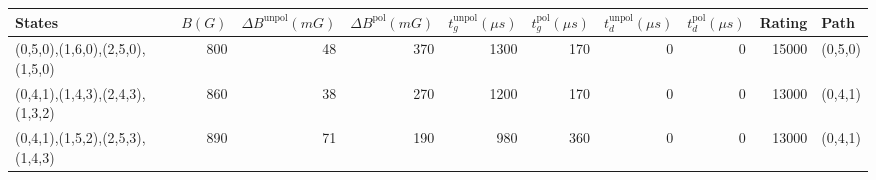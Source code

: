 \begin{tabular}{lrrrrrrrrl}
\hline
 {States}                        &   {$B(G)$} &   {$\Delta B^{\text{unpol}}(mG)$} &   {$\Delta B^{\text{pol}}(mG)$} &   {$t^{\text{unpol}}_{g}(\mu s)$} &   {$t^{\text{pol}}_{g}(\mu s)$} &   {$t^{\text{unpol}}_{d}(\mu s)$} &   {$t^{\text{pol}}_{d}(\mu s)$} &   {Rating} & {Path}   \\
\hline
 (0,5,0),(1,6,0),(2,5,0),(1,5,0) &        800 &                                48 &                             370 &                              1300 &                             170 &                                 0 &                               0 &      15000 & (0,5,0)  \\
 (0,4,1),(1,4,3),(2,4,3),(1,3,2) &        860 &                                38 &                             270 &                              1200 &                             170 &                                 0 &                               0 &      13000 & (0,4,1)  \\
 (0,4,1),(1,5,2),(2,5,3),(1,4,3) &        890 &                                71 &                             190 &                               980 &                             360 &                                 0 &                               0 &      13000 & (0,4,1)  \\
\hline
\end{tabular}